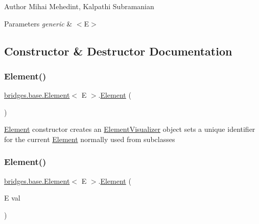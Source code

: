 \begin{DoxyAuthor}{Author}
Mihai Mehedint, Kalpathi Subramanian
\end{DoxyAuthor}

\begin{DoxyParams}{Parameters}
{\em generic} & $<$\+E$>$ \\
\hline
\end{DoxyParams}


\subsection{Constructor \& Destructor Documentation}
\hypertarget{classbridges_1_1base_1_1_element_aa5fc5728f2ed4b041118a77409442390}{}\label{classbridges_1_1base_1_1_element_aa5fc5728f2ed4b041118a77409442390} 
\subsubsection{\texorpdfstring{Element()}{Element()}\hspace{0.1cm}{\footnotesize\ttfamily [1/4]}}
{\footnotesize\ttfamily \hyperlink{classbridges_1_1base_1_1_element}{bridges.\+base.\+Element}$<$ E $>$.\hyperlink{classbridges_1_1base_1_1_element}{Element} (\begin{DoxyParamCaption}{ }\end{DoxyParamCaption})}

\hyperlink{classbridges_1_1base_1_1_element}{Element} constructor creates an \hyperlink{classbridges_1_1base_1_1_element_visualizer}{Element\+Visualizer} object sets a unique identifier for the current \hyperlink{classbridges_1_1base_1_1_element}{Element} normally used from subclasses \hypertarget{classbridges_1_1base_1_1_element_a6cb9b3b85b923602aad5c1be6696d825}{}\label{classbridges_1_1base_1_1_element_a6cb9b3b85b923602aad5c1be6696d825} 
\subsubsection{\texorpdfstring{Element()}{Element()}\hspace{0.1cm}{\footnotesize\ttfamily [2/4]}}
{\footnotesize\ttfamily \hyperlink{classbridges_1_1base_1_1_element}{bridges.\+base.\+Element}$<$ E $>$.\hyperlink{classbridges_1_1base_1_1_element}{Element} (\begin{DoxyParamCaption}\item[{E}]{val }\end{DoxyParamCaption})}

